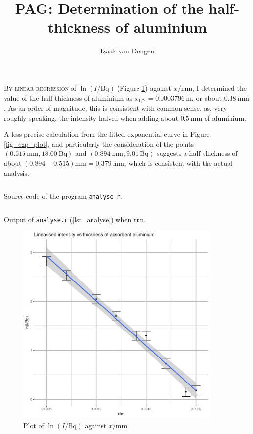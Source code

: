 \documentclass[a4paper,11pt]{article}
\title{PAG: Determination of the half-thickness of aluminium}
\author{Izaak van Dongen}
\newenvironment{longlisting}
{\addvspace{\baselineskip}\captionsetup{type=listing}}
{\addvspace{\baselineskip}}
\begin{document}
    \maketitle%

    \lettrine{B}{y linear regression} of \(\ln(I/\si{\becquerel})\) (Figure
    \ref{fig_log_plot}) against \(x/\si{\milli\metre}\), I determined the value
    of the half thickness of aluminium as \(x_{1/2} = \SI{0.0003796}{\metre}\),
    or about \(\SI{0.38}{\milli\metre}\). As an order of magnitude, this is
    consistent with common sense, as, very roughly speaking, the intensity
    halved when adding about \(\SI{0.5}{\milli\metre}\) of aluminium.

    A less precise calculation from the fitted exponential curve in Figure
    \ref{fig_exp_plot}, and particularly the consideration of the points
    \((\SI{0.515}{\milli\metre}, \SI{18.00}{\becquerel})\) and
    \((\SI{0.894}{\milli\metre}, \SI{9.01}{\becquerel})\) suggests a
    half-thickness of about \((0.894 - 0.515)\si{\milli\metre} =
    \SI{0.379}{\milli\metre}\), which is consistent with the actual analysis.

\begin{longlisting}
\inputminted{R}{analyse.r}
\caption{Source code of the program \texttt{analyse.r}.}
\label{lst_analyse}
\end{longlisting}

\begin{longlisting}
\inputminted{text}{analysis_output.txt}
\caption{Output of \texttt{analyse.r} (\ref{lst_analyse}) when run.}
\label{lst_results}
\end{longlisting}

\begin{figure}[H]
\begin{center}
\includegraphics[width=0.9\textwidth,page=1]{Rplots.pdf}
\end{center}
\caption{Plot of \(\ln(I/\si{\becquerel})\) against \(x / \si{\milli\metre}\)}
\label{fig_log_plot}
\end{figure}
\end{document}
